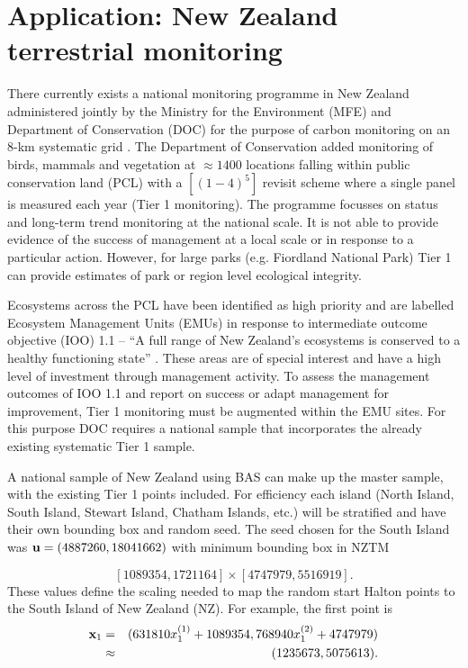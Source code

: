 \documentclass[titlepage]{article}
\begin{document}
\section{Application: New Zealand terrestrial monitoring}
There currently exists a national monitoring programme in New Zealand administered jointly by the Ministry for the Environment (MFE) and Department of Conservation (DOC) for the purpose of carbon monitoring on an 8-km systematic grid \citep{Coomes2002}. The Department of Conservation added monitoring of birds, mammals and vegetation at $\approx 1400$ locations falling within public conservation land (PCL) with a $[(1-4)^5]$ revisit scheme where a single panel is measured each year (Tier 1 monitoring). The programme focusses on status and long-term trend monitoring at the national scale. It is not able to provide evidence of the success of management at a local scale or in response to a particular action. However, for large parks (e.g. Fiordland National Park) Tier 1 can provide estimates of park or region level ecological integrity.

Ecosystems across the PCL have been identified as high priority and are labelled Ecosystem Management Units (EMUs) in response to intermediate outcome objective (IOO) 1.1 -- ``A full range of New Zealand's ecosystems is conserved to a healthy functioning state'' \citep{DOCIOO}. These areas are of special interest and have a high level of investment through management activity. To assess the management outcomes of IOO 1.1 and report on success or adapt management for improvement, Tier 1 monitoring must be augmented within the EMU sites. For this purpose DOC requires a national sample that incorporates the already existing systematic Tier 1 sample.

A national sample of New Zealand using BAS can make up the master sample, with the existing Tier 1 points included. For efficiency each island (North Island, South Island, Stewart Island, Chatham Islands, etc.) will be stratified and have their own bounding box and random seed. The seed chosen for the South Island was ${\bf u} = (4887260, 18041662)$ with minimum bounding box in NZTM

$$
[1089354, 1721164] \times [4747979, 5516919].
$$
These values define the scaling needed to map the random start Halton points to the South Island of New Zealand (NZ). For example, the first point is
\begin{eqnarray*}
	{\bf x}_1 & = & (631810 x_1^{(1)} + 1089354, 768940 x_1^{(2)} + 4747979)\\
	& \approx & (1235673, 5075613).
\end{eqnarray*}
\end{document}
